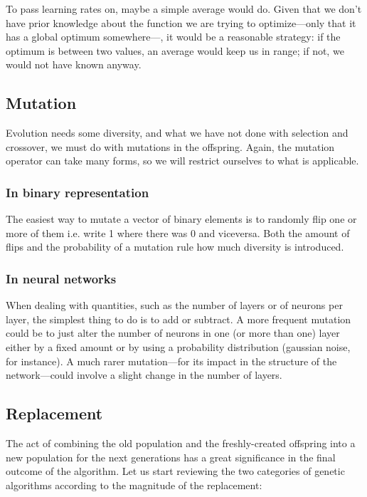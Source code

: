 			To pass learning rates on, maybe a simple average would do. Given that we don't have prior knowledge about the function we are trying to optimize---only that it has a global optimum somewhere---, it would be a reasonable strategy: if the optimum is between two values, an average would keep us in range; if not, we would not have known anyway.

\newpage

	\subsection{Mutation}

		Evolution needs some diversity, and what we have not done with selection and crossover, we must do with mutations in the offspring.
		Again, the mutation operator can take many forms, so we will restrict ourselves to what is applicable.

		\subsubsection{In binary representation}

			The easiest way to mutate a vector of binary elements is to randomly flip one or more of them i.e. write 1 where there was 0 and viceversa. Both the amount of flips and the probability of a mutation rule how much diversity is introduced.

		\subsubsection{In neural networks}

			When dealing with quantities, such as the number of layers or of neurons per layer, the simplest thing to do is to add or subtract. A more frequent mutation could be to just alter the number of neurons in one (or more than one) layer either by a fixed amount or by using a probability distribution (gaussian noise, for instance). A much rarer mutation---for its impact in the structure of the network---could involve a slight change in the number of layers.


	\subsection{Replacement}

		The act of combining the old population and the freshly-created offspring into a new population for the next generations has a great significance in the final outcome of the algorithm. Let us start reviewing the two categories of genetic algorithms according to the magnitude of the replacement:

